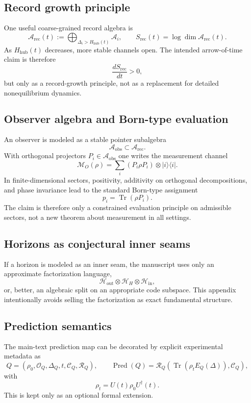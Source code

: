 \documentclass[11pt,a4paper]{article}
\theoremstyle{definition}
\theoremstyle{remark}
\DeclareMathOperator{\tr}{Tr}
\newcommand{\Arec}{\mathcal A_{\mathrm{rec}}}
\newcommand{\Aobs}{\mathcal A_{\mathrm{obs}}}
\newcommand{\Hhub}{H_{\mathrm{hub}}}
\newcommand{\Pred}{\operatorname{Pred}}
\begin{document}
\subsection{Record growth principle}

One useful coarse-grained record algebra is
\[
\Arec(t):=\bigoplus_{\Delta_i>\Hhub(t)}\mathcal A_i,
\qquad
S_{\mathrm{rec}}(t)=\log\dim\Arec(t).
\]
As $\Hhub(t)$ decreases, more stable channels open. The intended arrow-of-time claim is therefore
\[
\frac{dS_{\mathrm{rec}}}{dt}>0,
\]
but only as a record-growth principle, not as a replacement for detailed nonequilibrium dynamics.

\subsection{Observer algebra and Born-type evaluation}

An observer is modeled as a stable pointer subalgebra
\[
\Aobs\subset\Arec.
\]
With orthogonal projectors $P_i\in\Aobs$ one writes the measurement channel
\[
\mathcal M_O(\rho)=\sum_i(P_i\rho P_i)\otimes |i\rangle\langle i|.
\]
In finite-dimensional sectors, positivity, additivity on orthogonal decompositions, and phase invariance lead to the standard Born-type assignment
\[
p_i=\tr(\rho P_i).
\]
The claim is therefore only a constrained evaluation principle on admissible sectors, not a new theorem about measurement in all settings.

\subsection{Horizons as conjectural inner seams}

If a horizon is modeled as an inner seam, the manuscript uses only an approximate factorization language,
\[
\mathcal H_{\mathrm{out}}\otimes\mathcal H_H\otimes\mathcal H_{\mathrm{in}},
\]
or, better, an algebraic split on an appropriate code subspace. This appendix intentionally avoids selling the factorization as exact fundamental structure.

\subsection{Prediction semantics}

The main-text prediction map can be decorated by explicit experimental metadata as
\[
Q=(\rho_0,\mathcal O_Q,\Delta_Q,t,\mathcal C_Q,\mathcal R_Q),
\qquad
\Pred(Q)=\mathcal R_Q\!\left(\tr(\rho_tE_Q(\Delta)),\mathcal C_Q\right),
\]
with
\[
\rho_t=U(t)\rho_0U^\dagger(t).
\]
This is kept only as an optional formal extension.
\end{document}
